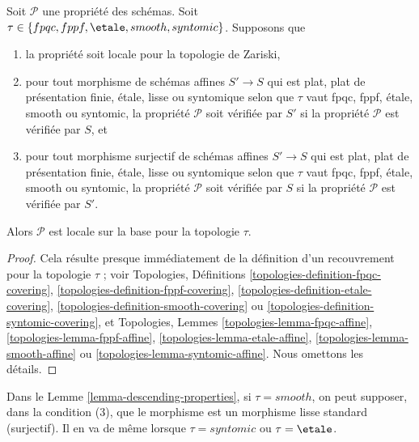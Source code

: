 \begin{lemma}
\label{lemma-descending-properties}
Soit $\mathcal{P}$ une propriété des schémas.
Soit $\tau \in \{fpqc, \linebreak[0] fppf, \linebreak[0]
\etale, \linebreak[0] smooth, \linebreak[0] syntomic\}$. Supposons que
\begin{enumerate}
\item la propriété soit locale pour la topologie de Zariski,
\item pour tout morphisme de schémas affines $S' \to S$ qui est plat,
plat de présentation finie, \'etale, lisse ou syntomique selon que $\tau$
vaut fpqc, fppf, \'etale, smooth ou syntomic, la propriété $\mathcal{P}$
soit vérifiée par $S'$ si la propriété $\mathcal{P}$ est vérifiée par $S$, et
\item pour tout morphisme surjectif de schémas affines $S' \to S$ qui est
plat, plat de présentation finie, \'etale, lisse ou syntomique selon que
$\tau$ vaut fpqc, fppf, \'etale, smooth ou syntomic, la propriété
$\mathcal{P}$ soit vérifiée par $S$ si la propriété $\mathcal{P}$ est
vérifiée par $S'$.
\end{enumerate}
Alors $\mathcal{P}$ est locale sur la base pour la topologie $\tau$.
\end{lemma}

\begin{proof}
Cela résulte presque immédiatement de la définition d'un recouvrement pour
la topologie $\tau$ ; voir Topologies, Définitions
\ref{topologies-definition-fpqc-covering},
\ref{topologies-definition-fppf-covering},
\ref{topologies-definition-etale-covering},
\ref{topologies-definition-smooth-covering} ou
\ref{topologies-definition-syntomic-covering}, et Topologies, Lemmes
\ref{topologies-lemma-fpqc-affine},
\ref{topologies-lemma-fppf-affine},
\ref{topologies-lemma-etale-affine},
\ref{topologies-lemma-smooth-affine} ou
\ref{topologies-lemma-syntomic-affine}. Nous omettons les détails.
\end{proof}

\begin{remark}
\label{remark-descending-properties-standard}
Dans le Lemme \ref{lemma-descending-properties}, si $\tau = smooth$, on
peut supposer, dans la condition (3), que le morphisme est un morphisme
lisse standard (surjectif). Il en va de même lorsque $\tau = syntomic$ ou
$\tau = \etale$.
\end{remark}





